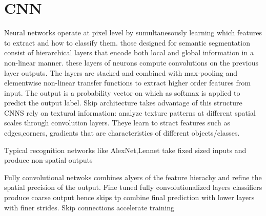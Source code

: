 \chapter{CNN}
\cite{fully convolutional networs for semantic seg}
Neural networks operate at pixel level by sumultanesously learning which features to extract and how to classify them.
those designed for semantic segmentation consist of hierarchical layers that encode both local and global information in a non-linear manner. these layers of neurons compute convolutions on the previous layer outputs. The layers are stacked and combined with max-pooling and elementwise non-linear transfer functions to extract higher order features from input. The output is a probability vector on which as softmax is applied to predict the output label.
Skip architecture takes advantage of this structure
CNNS rely on textural information: analyze texture patterns at different spatial scales through convolution layers. Theye learn to stract features such as edges,corners, gradients that are characteristics of different objects/classes. 


Typical recognition networks like AlexNet,Lennet take fixed sized inputs and produce non-spatial outputs

Fully convolutional netwoks combines alyers of the feature hierachy and refine the spatial precision of the output.
Fine tuned fully convolutionalized layers classifiers produce coarse output hence skips tp combine final prediction with lower layers with finer strides.
Skip connections accelerate training